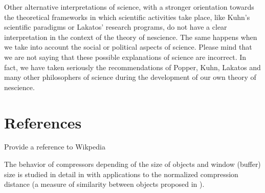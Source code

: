 Other alternative interpretations of science, with a stronger orientation towards the theoretical frameworks in which scientific activities take place, like Kuhn's scientific paradigms or Lakatos' research programs, do not have a clear interpretation in the context of the theory of nescience. The same happens when we take into account the social or political aspects of science. Please mind that we are not saying that these possible explanations of science are incorrect. In fact, we have taken seriously the recommendations of Popper, Kuhn, Lakatos and many other philosophers of science during the development of our own theory of nescience.


%
%
\section*{References}

{\color{red} Provide a reference to Wikpedia}

The behavior of compressors depending of the size of objects and window (buffer) size is studied in detail in \cite{cebrian2005common} with applications to the normalized compression distance (a measure of similarity between objects proposed in \cite{li2004similarity}).


